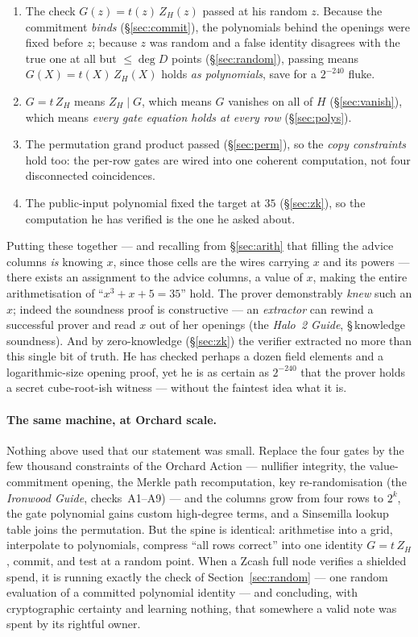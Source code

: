 \documentclass[11pt,a4paper]{article}
\theoremstyle{definition}
\newcommand{\ZH}{Z_H}
\DeclareMathOperator{\degr}{deg}
\begin{document}
\begin{enumerate}[leftmargin=*,itemsep=1pt]
\item The check $G(z) = t(z)\,\ZH(z)$ passed at his random $z$. Because the
commitment \emph{binds} (\S\ref{sec:commit}), the polynomials behind the
openings were fixed before $z$; because $z$ was random and a false identity
disagrees with the true one at all but $\le \degr D$ points
(\S\ref{sec:random}), passing means $G(X) = t(X)\,\ZH(X)$ holds \emph{as
polynomials}, save for a $2^{-240}$ fluke.
\item $G = t\,\ZH$ means $\ZH \mid G$, which means $G$ vanishes on all of $H$
(\S\ref{sec:vanish}), which means \emph{every gate equation holds at every
row} (\S\ref{sec:polys}).
\item The permutation grand product passed (\S\ref{sec:perm}), so the
\emph{copy constraints} hold too: the per-row gates are wired into one
coherent computation, not four disconnected coincidences.
\item The public-input polynomial fixed the target at $35$ (\S\ref{sec:zk}), so
the computation he has verified is the one he asked about.
\end{enumerate}
Putting these together --- and recalling from \S\ref{sec:arith} that filling
the advice columns \emph{is} knowing $x$, since those cells are the wires
carrying $x$ and its powers --- there exists an assignment to the advice
columns, a value of $x$, making the entire arithmetisation of
``$x^3 + x + 5 = 35$'' hold. The prover demonstrably \emph{knew} such an $x$; indeed the soundness
proof is constructive --- an \emph{extractor} can rewind a successful prover
and read $x$ out of her openings (the \emph{Halo~2 Guide}, \S\,knowledge
soundness). And by zero-knowledge (\S\ref{sec:zk}) the verifier extracted no
more than this single bit of truth. He has checked perhaps a dozen field
elements and a logarithmic-size opening proof, yet he is as certain as
$2^{-240}$ that the prover holds a secret cube-root-ish witness --- without the
faintest idea what it is.

\paragraph{The same machine, at Orchard scale.} Nothing above used that our
statement was small. Replace the four gates by the few thousand constraints of
the Orchard Action --- nullifier integrity, the value-commitment opening, the
Merkle path recomputation, key re-randomisation (the \emph{Ironwood Guide},
checks~A1--A9) --- and the columns grow from four rows to $2^{k}$, the gate
polynomial gains custom high-degree terms, and a Sinsemilla lookup table joins
the permutation. But the spine is identical: arithmetise into a grid, interpolate
to polynomials, compress ``all rows correct'' into one identity $G = t\,\ZH$,
commit, and test at a random point. When a Zcash full node verifies a shielded
spend, it is running exactly the check of Section~\ref{sec:random} --- one
random evaluation of a committed polynomial identity --- and concluding,
with cryptographic certainty and learning nothing, that somewhere a valid note
was spent by its rightful owner.
\end{document}
